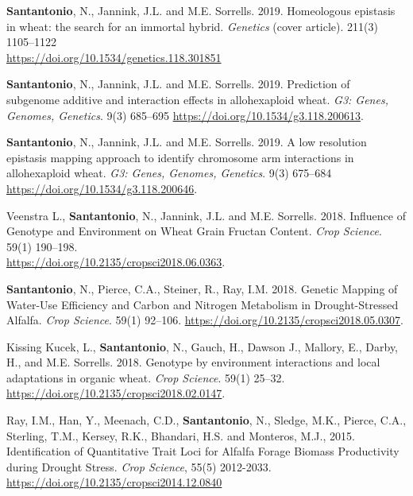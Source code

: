 \documentclass[10pt]{article}
\begin{document}
\begin{bibenum}

    \item \textbf{Santantonio}, N., Jannink, J.L. and M.E. Sorrells. 2019. Homeologous epistasis in wheat: the search for an immortal hybrid. \emph{Genetics} (cover article). 211(3) 1105--1122 \\ \href{https://doi.org/10.1534/genetics.118.301851}{https://doi.org/10.1534/genetics.118.301851}

    \item \textbf{Santantonio}, N., Jannink, J.L. and M.E. Sorrells. 2019. Prediction of subgenome additive and interaction effects in allohexaploid wheat. \emph{G3: Genes, Genomes, Genetics}. 9(3) 685--695  \href{https://doi.org/10.1534/g3.118.200613}{https://doi.org/10.1534/g3.118.200613}.
    
    \item \textbf{Santantonio}, N., Jannink, J.L. and M.E. Sorrells. 2019. A low resolution epistasis mapping approach to identify chromosome arm interactions in allohexaploid wheat. \emph{G3: Genes, Genomes, Genetics}. 9(3) 675--684  \href{https://doi.org/10.1534/g3.118.200646}{https://doi.org/10.1534/g3.118.200646}.

    \item Veenstra L., \textbf{Santantonio}, N., Jannink, J.L. and M.E. Sorrells. 2018. Influence of Genotype and Environment on Wheat Grain Fructan Content. \emph{Crop Science}. 59(1) 190--198. \\ \href{https://doi.org/10.2135/cropsci2018.06.0363}{https://doi.org/10.2135/cropsci2018.06.0363}.
    
    \item \textbf{Santantonio}, N., Pierce, C.A., Steiner, R., Ray, I.M. 2018. Genetic Mapping of Water-Use Efficiency and Carbon and Nitrogen Metabolism in Drought-Stressed Alfalfa. \emph{Crop Science}. 59(1) 92--106. \href{https://doi.org/10.2135/cropsci2018.05.0307}{https://doi.org/10.2135/cropsci2018.05.0307}.

    \item Kissing Kucek, L., \textbf{Santantonio}, N., Gauch, H., Dawson J., Mallory, E., Darby, H., and M.E. Sorrells. 2018. Genotype by environment interactions and local adaptations in organic wheat. \emph{Crop Science}. 59(1) 25--32. \href{https://doi.org/10.2135/cropsci2018.02.0147}{https://doi.org/10.2135/cropsci2018.02.0147}.

    \item Ray, I.M., Han, Y., Meenach, C.D., \textbf{Santantonio}, N., Sledge, M.K., Pierce, C.A., Sterling, T.M., Kersey, R.K., Bhandari, H.S. and Monteros, M.J., 2015. Identification of Quantitative Trait Loci for Alfalfa Forage Biomass Productivity during Drought Stress. \emph{Crop Science}, 55(5) 2012-2033. \href{https://doi.org/10.2135/cropsci2014.12.0840}{https://doi.org/10.2135/cropsci2014.12.0840}   

\end{bibenum}
\end{document}

